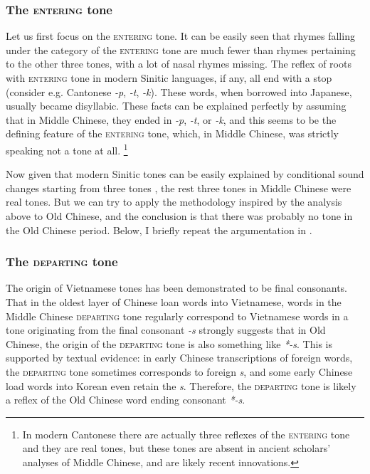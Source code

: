 \documentclass[UTF8, a4paper, oneside, scheme=plain, 12pt]{ctexrep}
\newcommand{\form}[1]{\emph{#1}}
\newcommand*{\category}[1]{\textsc{#1}}
\begin{document}
\subsubsection{The \category{entering} tone}

Let us first focus on the \category{entering} tone.
It can be easily seen that rhymes falling under the category of the \category{entering} tone are much fewer than rhymes pertaining to the other three tones,
with a lot of nasal rhymes missing.
The reflex of roots with \category{entering} tone in modern Sinitic languages, if any,
all end with a stop (consider e.g. Cantonese \form{-p}, \form{-t}, \form{-k}).
These words, when borrowed into Japanese, usually became disyllabic.
These facts can be explained perfectly by assuming that in Middle Chinese,
they ended in \form{-p}, \form{-t}, or \form{-k},
and this seems to be the defining feature of the \category{entering} tone,
which, in Middle Chinese, was strictly speaking not a tone at all.%
\footnote{
    In modern Cantonese there are actually three reflexes of the \category{entering} tone
    and they are real tones,
    but these tones are absent in ancient scholars' analyses of Middle Chinese,
    and are likely recent innovations.
}

Now given that modern Sinitic tones can be easily explained by 
conditional sound changes starting from three tones \citep{sagart1999origin},
the rest three tones in Middle Chinese were real tones.
But we can try to apply the methodology inspired by the analysis above to Old Chinese,
and the conclusion is that there was probably no tone in the Old Chinese period.
Below, I briefly repeat the argumentation in \citet{sagart1999origin}.

\subsubsection{The \category{departing} tone}

The origin of Vietnamese tones has been demonstrated to be final consonants.
That in the oldest layer of Chinese loan words into Vietnamese,
words in the Middle Chinese \category{departing} tone regularly correspond to Vietnamese words in a tone originating from the final consonant \form{-s}
strongly suggests that in Old Chinese,
the origin of the \category{departing} tone is also something like \form{*-s}.
This is supported by textual evidence:
in early Chinese transcriptions of foreign words,
the \category{departing} tone sometimes corresponds to foreign \form{s},
and some early Chinese load words into Korean even retain the \form{s}.
Therefore, the \category{departing} tone is likely a reflex of the Old Chinese word ending consonant \form{*-s}.
\end{document}

